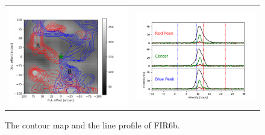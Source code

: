 \begin{figure}[h!]
	\begin{center}
		\begin{tabular}{cc}
			\includegraphics[width=7cm]{Orion_12CO2-1_FIR6b_rbcontour_400_modified} &   \includegraphics[width=7cm]{Orion_12CO2-1_FIR6b_line_profile_400}
		\end{tabular}
		\caption{The contour map and the line profile of FIR6b. }
	\label{fig:FIR6b21}
	\end{center}
\end{figure}

